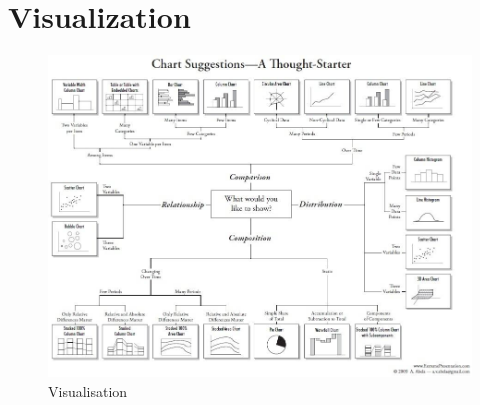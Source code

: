 \FILENAME\
\section{Visualization}

\begin{figure}
\centering
\includegraphics[width=\textwidth]{images/which-chart-when.jpeg}
\caption{Visualisation}
\end{figure}

